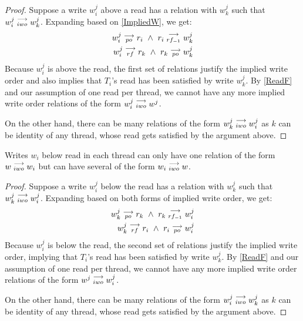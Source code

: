     \begin{proof}
        Suppose a write $w_i^j$ above a read has a relation with $w_k^j$ such that $w_i^j\stackrel{\longrightarrow}{_{iwo}}w_k^j$. Expanding based on \ref{ImpliedW}, we get:
        \begin{align}
            w_i^j\stackrel{\longrightarrow}{_{po}}r_i \ \wedge \ r_i\stackrel{\longrightarrow}{_{rf_{-1}}}w_k^j \\ 
            w_i^j\stackrel{\longrightarrow}{_{rf}}r_k \ \wedge \ r_k\stackrel{\longrightarrow}{_{po}}w_k^j
        \end{align}
        Because $w_i^j$ is above the read, the first set of relations justify the implied write order and also implies that $T_i$'s read has been satisfied by write $w_k^j$. By \ref{ReadF} and our assumption of one read per thread, we cannot have any more implied write order relations of the form $w_i^j\stackrel{\longrightarrow}{_{iwo}}w^j$. 

        On the other hand, there can be many relations of the form $w_k^j\stackrel{\longrightarrow}{_{iwo}}w_i^j$ as $k$ can be identity of any thread, whose read gets satisfied by the argument above.
    \end{proof}

   
    \begin{property}
        \label{prop8}
        Writes $w_i$ below read in each thread can only have one relation of the form $w\stackrel{\longrightarrow}{_{iwo}}w_i$ but can have several of the form $w_i\stackrel{\longrightarrow}{_{iwo}}w$. 
    \end{property}

    \begin{proof}
        Suppose a write $w_i^j$ below the read has a relation with $w_k^j$ such that $w_k^j\stackrel{\longrightarrow}{_{iwo}}w_i^j$. Expanding based on both forms of implied write order, we get:
        \begin{align}
            w_k^j\stackrel{\longrightarrow}{_{po}}r_k \ \wedge \ r_k\stackrel{\longrightarrow}{_{rf_{-1}}}w_i^j \\ 
            w_k^j\stackrel{\longrightarrow}{_{rf}}r_i \ \wedge \ r_i\stackrel{\longrightarrow}{_{po}}w_i^j
        \end{align}
        Because $w_i^j$ is below the read, the second set of relations justify the implied write order, implying that $T_i$'s read has been satisfied by write $w_k^j$. By \ref{ReadF} and our assumption of one read per thread, we cannot have any more implied write order relations of the form $w^j\stackrel{\longrightarrow}{_{iwo}}w_i^j$. 

        On the other hand, there can be many relations of the form $w_i^j\stackrel{\longrightarrow}{_{iwo}}w_k^j$ as $k$ can be identity of any thread, whose read gets satisfied by the argument above.  
    \end{proof}


